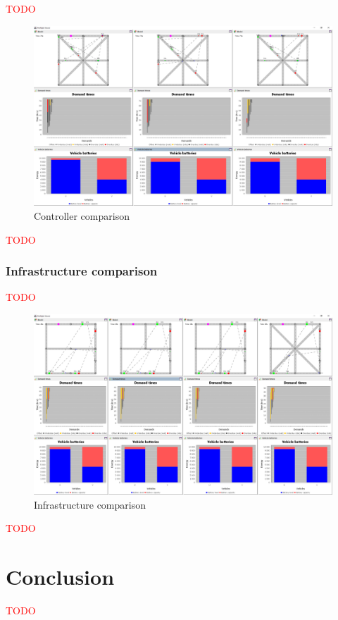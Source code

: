 \documentclass[10pt,twocolumn]{article}
\begin{document}
\textcolor{red}{TODO}

\begin{figure}[tbp]
    \includegraphics[width=\textwidth]{../../screenshots/controller-comparison.png}
    \caption{Controller comparison}
    \label{fig:controller-comparison}
\end{figure}

\textcolor{red}{TODO}

\subsubsection{Infrastructure comparison}
\label{sec:infrastructure-comparison}

\textcolor{red}{TODO}

\begin{figure}[tbp]
    \includegraphics[width=\textwidth]{../../screenshots/infrastructure-comparison.png}
    \caption{Infrastructure comparison}
    \label{fig:infratructure-comparison}
\end{figure}

\textcolor{red}{TODO}

\section{Conclusion}
\label{sec:conclusion}

\textcolor{red}{TODO}



\end{document}
